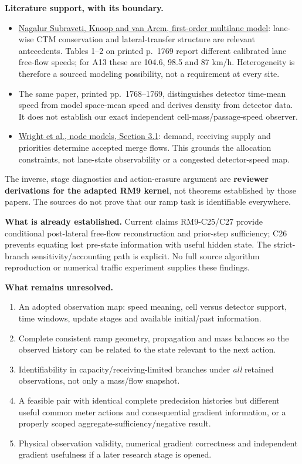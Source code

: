 \documentclass[11pt]{article}
\begin{document}
\textbf{Literature support, with its boundary.}
\begin{itemize}
\item \href{https://repository.tudelft.nl/file/File_2c4359e7-5e5a-4651-964f-6f3610ab89ae}{Nagalur Subraveti, Knoop and van Arem, first-order multilane model}:
lane-wise CTM conservation and lateral-transfer structure are relevant
antecedents. Tables 1--2 on printed p.\ 1769 report different calibrated lane
free-flow speeds; for A13 these are 104.6, 98.5 and 87 km/h. Heterogeneity is
therefore a sourced modeling possibility, not a requirement at every site.
\item The same paper, printed pp.\ 1768--1769, distinguishes detector time-mean
speed from model space-mean speed and derives density from detector data.
It does not establish our exact independent cell-mass/passage-speed observer.
\item \href{https://horowitz.me.berkeley.edu/Publications_files/All_papers_numbered/Wright_node_models_transportation_networks_Transportation_research_B_2017.pdf}{Wright et al., node models, Section 3.1}:
demand, receiving supply and priorities determine accepted merge flows.
This grounds the allocation constraints, not lane-state observability or a
congested detector-speed map.
\end{itemize}
The inverse, stage diagnostics and action-erasure argument are \textbf{reviewer
derivations for the adapted RM9 kernel}, not theorems established by those
papers. The sources do not prove that our ramp task is identifiable everywhere.

\textbf{What is already established.} Current claims RM9-C25/C27 provide
conditional post-lateral free-flow reconstruction and prior-step sufficiency;
C26 prevents equating lost pre-state information with useful hidden state.
The strict-branch sensitivity/accounting path is explicit. No full source
algorithm reproduction or numerical traffic experiment supplies these findings.

\textbf{What remains unresolved.}
\begin{enumerate}
\item An adopted observation map: speed meaning, cell versus detector support,
time windows, update stages and available initial/past information.
\item Complete consistent ramp geometry, propagation and mass balances so the
observed history can be related to the state relevant to the next action.
\item Identifiability in capacity/receiving-limited branches under \emph{all}
retained observations, not only a mass/flow snapshot.
\item A feasible pair with identical complete predecision histories but different
useful common meter actions and consequential gradient information, or a
properly scoped aggregate-sufficiency/negative result.
\item Physical observation validity, numerical gradient correctness and independent
gradient usefulness if a later research stage is opened.
\end{enumerate}
\end{document}
